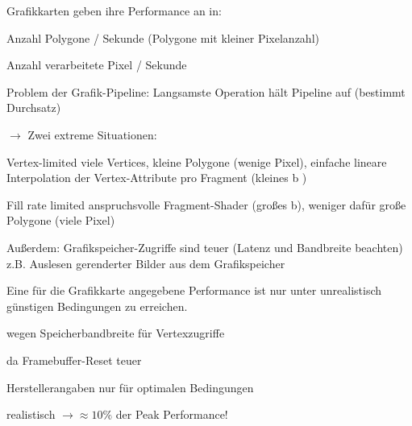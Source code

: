 \documentclass[landscape]{article}
\begin{document}
\begin{multicols}{3}
  \begin{itemize*}
    \item Grafikkarten geben ihre Performance an in:
    \begin{itemize*}
      \item Anzahl Polygone / Sekunde (Polygone mit kleiner Pixelanzahl)
      \item Anzahl verarbeitete Pixel / Sekunde
    \end{itemize*}
    \item Problem der Grafik-Pipeline: Langsamste Operation hält Pipeline auf (bestimmt Durchsatz) 
    \item $\rightarrow$ Zwei extreme Situationen:
    \begin{description*}
      \item[Vertex-limited] viele Vertices, kleine Polygone (wenige Pixel), einfache lineare Interpolation der Vertex-Attribute pro Fragment (kleines b )
      \item[Fill rate limited] anspruchsvolle Fragment-Shader (großes b), weniger dafür große Polygone (viele Pixel)
    \end{description*}
    \item Außerdem: Grafikspeicher-Zugriffe sind teuer (Latenz und Bandbreite beachten) z.B. Auslesen gerenderter Bilder aus dem Grafikspeicher
    \item Eine für die Grafikkarte angegebene Performance ist nur unter unrealistisch günstigen Bedingungen zu erreichen.
    \begin{itemize*}
      \item wegen Speicherbandbreite für Vertexzugriffe
      \item da Framebuffer-Reset teuer
      \item Herstellerangaben nur für optimalen Bedingungen
      \item realistisch $\rightarrow\approx 10\%$ der Peak Performance!
    \end{itemize*}
  \end{itemize*}
  

\end{multicols}
\end{document}
